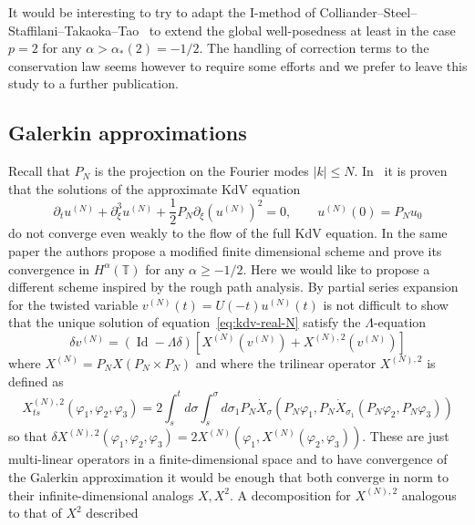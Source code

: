 \documentclass[a4paper,11pt,reqno]{article}
\newcommand{\der}{\delta}
\newcommand{\TT}{\mathbb{T}}
\DeclareMathOperator{\id}{\text{Id}}
\begin{document}
It would be interesting to try to adapt the I-method
 of Colliander--Steel--Staffilani--Takaoka--Tao~\cite{MR1969209}  to extend the global well-posedness at least in the case $p=2$ for any $\alpha >  \alpha_*(2)= -1/2$. The handling of correction terms to the conservation law seems however to require some efforts and we prefer to leave this study to a further publication.


\subsection{Galerkin approximations}
\label{sec:galerkin}
Recall that $P_N$  is the projection on the Fourier modes $|k| \le N$. In~\cite{MR2233689} it is proven that the solutions of the approximate KdV equation
\begin{equation}
  \label{eq:kdv-real-N}
\partial_t u^{(N)} + \partial^3_\xi u^{(N)} +
\frac12 P_N \partial_\xi (u^{(N)})^2 = 0,
\qquad u^{(N)}(0) = P_N u_0
\end{equation}
do not converge even weakly to the flow of the full KdV equation. In the same paper the authors propose a modified finite dimensional scheme and prove its convergence in $H^{\alpha}(\TT)$ for any $\alpha \ge -1/2$. Here we would like to propose a different scheme inspired by the rough path analysis.
By partial series expansion for the twisted variable $v^{(N)}(t) = U(-t) u^{(N)}(t)$ is not difficult to show that the unique solution of equation~\eqref{eq:kdv-real-N} satisfy the $\Lambda$-equation
\begin{equation}
  \label{eq:abs-step-2-compact-N}
\der v^{(N)} = (\id - \Lambda \der)[X^{(N)}(v^{(N)})+X^{(N),2}(v^{(N)})]
\end{equation}
where 
$X^{(N)} = P_N X ( P_N \times P_N )$ and where the trilinear operator $X^{(N),2}$ is defined as
\begin{equation}
  \label{eq:X2-galerkin}
X^{(N),2}_{ts}(\varphi_1,\varphi_2,\varphi_3) = 2 \int_s^t d\sigma \int_s^\sigma d\sigma_1 P_N \dot X_\sigma(P_N \varphi_1,P_N \dot X_{\sigma_1}(P_N \varphi_2,P_N \varphi_3))  
\end{equation}
so that 
$
\der X^{(N),2}(\varphi_1,\varphi_2,\varphi_3) = 2 X^{(N)}(\varphi_1,X^{(N)}(\varphi_2,\varphi_3))
$.
These are just multi-linear operators in
a finite-dimensional space and to have convergence of the Galerkin
approximation it would be enough that both converge in norm to their
infinite-dimensional analogs $X,X^2$. 
A decomposition for   $X^{(N),2}$ analogous to that of $X^2$ described
\end{document}
